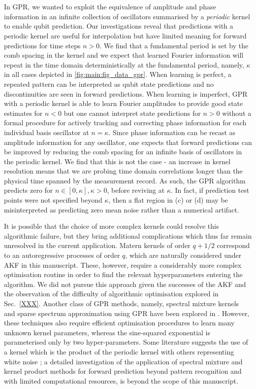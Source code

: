 \documentclass[pra, reprint]{revtex4-1}
\begin{document}
\\
\\
In GPR, we wanted to exploit the equivalence of amplitude and phase information in an infinite collection of oscillators summarised by a \textit{periodic} kernel to enable qubit prediction. Our investigations reveal that predictions with a periodic kernel are useful for interpolation but have limited meaning for forward predictions for time steps $n >0$.  We find that a fundamental period is set by the comb spacing in the kernel and we expect that learned Fourier information will repeat in the time domain deterministically at the fundamental period, namely, $\kappa$ in all cases depicted in \cref{fig:main:fig_data_gpr}. When learning is perfect, a repeated pattern can be interpreted as qubit state predictions and no discontinuities are seen in forward predictions. When learning is imperfect, GPR  with a periodic kernel is able to learn Fourier amplitudes to provide good state estimates for $n<0$ but one cannot interpret state predictions for $n>0$ without a formal procedure for actively tracking and correcting phase information for each individual basis oscillator at $n= \kappa$. Since phase information can be recast as amplitude information for any oscillator, one expects that forward predictions can be improved by reducing the comb spacing for an infinite basis of oscillators in the periodic kernel.  We find that this is not the case - an increase in kernel resolution means that we are probing time domain correlations longer than the physical time spanned by the measurement record. As such, the GPR algorithm predicts zero for $n \in [0, \kappa], \kappa > 0$, before reviving at $\kappa$.  In fact, if prediction test points were not specified beyond $\kappa$, then a flat region in (c) or (d) may be misinterpreted as predicting zero mean noise rather than a numerical artifact.

It is possible that the choice of more complex kernels could resolve this algorithmic failure, but they bring additional complications which thus far remain unresolved in the current application.  Matern kernels of order $q + 1/2$ correspond to an autoregressive processes of order $q$, which are naturally considered under AKF in this manuscript. These, however, require a considerably more complex optimisation routine in order to find the relevant hyperparameters entering the algorithm.  We did not pursue this approach given the successes of the AKF and the observation of the difficulty of algorithmic optimisation explored in Sec.~\ref{XXX}.  Another class of GPR methods, namely, spectral mixture kernels and sparse spectrum approximation using GPR have been explored in \cite{wilson2013, quia2010}. However, these techniques also require efficient optimisation procedures to learn many unknown kernel parameters, whereas the sine-squared exponential is parameterised only by two hyper-parameters.  Some literature suggests the use of a kernel which is the product of the periodic kernel with others representing white noise \cite{klenske2016gaussian}; a detailed investigation of the application of spectral mixture and kernel product methods for forward prediction beyond pattern recognition and with limited computational resources, is beyond the scope of this manuscript. 
\end{document}
